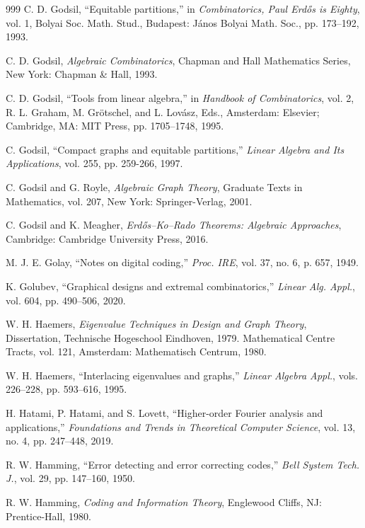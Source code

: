 \documentclass[11pt]{article}
\theoremstyle{definition}
\begin{document}
{{{\begin{thebibliography}{999}
C. D. Godsil,
``Equitable partitions,''
in \textit{Combinatorics, Paul Erdős is Eighty}, vol. 1,
Bolyai Soc. Math. Stud., Budapest: János Bolyai Math. Soc., pp. 173--192, 1993.






C. D. Godsil,
\textit{Algebraic Combinatorics},
Chapman and Hall Mathematics Series, New York: Chapman \& Hall, 1993.

C. D. Godsil,
``Tools from linear algebra,''
in \textit{Handbook of Combinatorics}, vol. 2,
R. L. Graham, M. Grötschel, and L. Lovász, Eds.,
Amsterdam: Elsevier; Cambridge, MA: MIT Press, pp. 1705--1748, 1995.

 C. Godsil, ``Compact graphs and equitable partitions,'' \textit{ Linear Algebra and Its Applications},
vol. 255, pp. 259-266,  1997.



C. Godsil and G. Royle,
\textit{Algebraic Graph Theory},
Graduate Texts in Mathematics, vol. 207,
New York: Springer-Verlag, 2001.

C. Godsil and K. Meagher,
\textit{Erdős--Ko--Rado Theorems: Algebraic Approaches},
Cambridge: Cambridge University Press, 2016.

M. J. E. Golay,
``Notes on digital coding,''
\textit{Proc. IRE}, vol. 37, no. 6, p. 657, 1949.

K. Golubev,
``Graphical designs and extremal combinatorics,''
\textit{Linear Alg. Appl.}, vol. 604, pp. 490--506, 2020.

W. H. Haemers,
\textit{Eigenvalue Techniques in Design and Graph Theory},
Dissertation, Technische Hogeschool Eindhoven, 1979.
Mathematical Centre Tracts, vol. 121,
Amsterdam: Mathematisch Centrum, 1980.

W. H. Haemers,
``Interlacing eigenvalues and graphs,''
\textit{Linear Algebra Appl.}, vols. 226--228, pp. 593--616, 1995.

H. Hatami, P. Hatami, and S. Lovett,
``Higher-order Fourier analysis and applications,''
\textit{Foundations and Trends in Theoretical Computer Science},
vol. 13, no. 4, pp. 247--448, 2019.

R. W. Hamming,
``Error detecting and error correcting codes,''
\textit{Bell System Tech. J.}, vol. 29, pp. 147--160, 1950.

R. W. Hamming,
\textit{Coding and Information Theory},
Englewood Cliffs, NJ: Prentice-Hall, 1980.


\end{thebibliography}}}}
\end{document}
